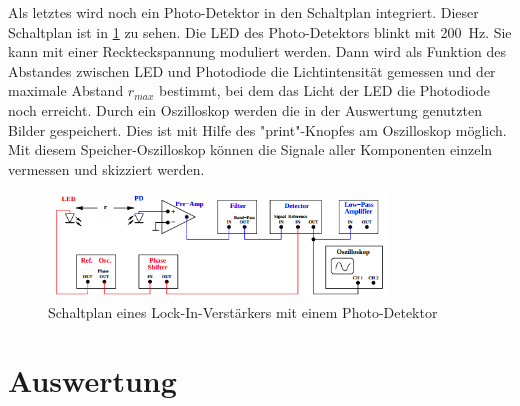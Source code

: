 \documentclass[
  bibliography=totoc,     %
  captions=tableheading,  %
  titlepage=firstiscover, %
]{scrartcl}
\begin{document}
Als letztes wird noch ein Photo-Detektor in den Schaltplan integriert. Dieser
Schaltplan ist in \ref{fig:V3032} zu sehen. Die LED des Photo-Detektors blinkt
mit \SI{200}{Hz}. Sie kann mit einer Reckteckspannung moduliert werden.
Dann wird als Funktion des Abstandes zwischen LED und Photodiode die
Lichtintensität gemessen und der maximale Abstand $r_{max}$ bestimmt, bei dem
das Licht der LED die Photodiode noch erreicht.
Durch ein Oszilloskop werden die in der Auswertung genutzten Bilder gespeichert.
Dies ist mit Hilfe des "print"-Knopfes am Oszilloskop möglich.
Mit diesem Speicher-Oszilloskop können die Signale aller Komponenten einzeln
vermessen und skizziert werden.
\begin{figure}[htb]
  \centering
  \includegraphics[width=0.8\textwidth]{V3032.png}
  \caption{Schaltplan eines Lock-In-Verstärkers mit einem Photo-Detektor \cite{anleitung}}
  \label{fig:V3032}
\end{figure}
\clearpage
\section{Auswertung}
\label{sec:auswertung}
\end{document}
